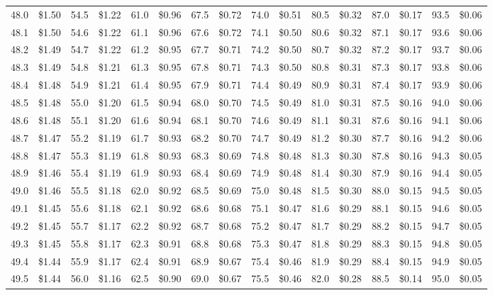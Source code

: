 \documentclass{article}
\begin{document}
\begin{tabular}{|*{8}{rr|}}
48.0 & \$1.50 & 54.5 & \$1.22 & 61.0 & \$0.96 & 67.5 & \$0.72 & 74.0 & \$0.51 & 80.5 & \$0.32 & 87.0 & \$0.17 & 93.5 & \$0.06\\
48.1 & \$1.50 & 54.6 & \$1.22 & 61.1 & \$0.96 & 67.6 & \$0.72 & 74.1 & \$0.50 & 80.6 & \$0.32 & 87.1 & \$0.17 & 93.6 & \$0.06\\
48.2 & \$1.49 & 54.7 & \$1.22 & 61.2 & \$0.95 & 67.7 & \$0.71 & 74.2 & \$0.50 & 80.7 & \$0.32 & 87.2 & \$0.17 & 93.7 & \$0.06\\
48.3 & \$1.49 & 54.8 & \$1.21 & 61.3 & \$0.95 & 67.8 & \$0.71 & 74.3 & \$0.50 & 80.8 & \$0.31 & 87.3 & \$0.17 & 93.8 & \$0.06\\
48.4 & \$1.48 & 54.9 & \$1.21 & 61.4 & \$0.95 & 67.9 & \$0.71 & 74.4 & \$0.49 & 80.9 & \$0.31 & 87.4 & \$0.17 & 93.9 & \$0.06\\
48.5 & \$1.48 & 55.0 & \$1.20 & 61.5 & \$0.94 & 68.0 & \$0.70 & 74.5 & \$0.49 & 81.0 & \$0.31 & 87.5 & \$0.16 & 94.0 & \$0.06\\
48.6 & \$1.48 & 55.1 & \$1.20 & 61.6 & \$0.94 & 68.1 & \$0.70 & 74.6 & \$0.49 & 81.1 & \$0.31 & 87.6 & \$0.16 & 94.1 & \$0.06\\
48.7 & \$1.47 & 55.2 & \$1.19 & 61.7 & \$0.93 & 68.2 & \$0.70 & 74.7 & \$0.49 & 81.2 & \$0.30 & 87.7 & \$0.16 & 94.2 & \$0.06\\
48.8 & \$1.47 & 55.3 & \$1.19 & 61.8 & \$0.93 & 68.3 & \$0.69 & 74.8 & \$0.48 & 81.3 & \$0.30 & 87.8 & \$0.16 & 94.3 & \$0.05\\
48.9 & \$1.46 & 55.4 & \$1.19 & 61.9 & \$0.93 & 68.4 & \$0.69 & 74.9 & \$0.48 & 81.4 & \$0.30 & 87.9 & \$0.16 & 94.4 & \$0.05\\
49.0 & \$1.46 & 55.5 & \$1.18 & 62.0 & \$0.92 & 68.5 & \$0.69 & 75.0 & \$0.48 & 81.5 & \$0.30 & 88.0 & \$0.15 & 94.5 & \$0.05\\
49.1 & \$1.45 & 55.6 & \$1.18 & 62.1 & \$0.92 & 68.6 & \$0.68 & 75.1 & \$0.47 & 81.6 & \$0.29 & 88.1 & \$0.15 & 94.6 & \$0.05\\
49.2 & \$1.45 & 55.7 & \$1.17 & 62.2 & \$0.92 & 68.7 & \$0.68 & 75.2 & \$0.47 & 81.7 & \$0.29 & 88.2 & \$0.15 & 94.7 & \$0.05\\
49.3 & \$1.45 & 55.8 & \$1.17 & 62.3 & \$0.91 & 68.8 & \$0.68 & 75.3 & \$0.47 & 81.8 & \$0.29 & 88.3 & \$0.15 & 94.8 & \$0.05\\
49.4 & \$1.44 & 55.9 & \$1.17 & 62.4 & \$0.91 & 68.9 & \$0.67 & 75.4 & \$0.46 & 81.9 & \$0.29 & 88.4 & \$0.15 & 94.9 & \$0.05\\
49.5 & \$1.44 & 56.0 & \$1.16 & 62.5 & \$0.90 & 69.0 & \$0.67 & 75.5 & \$0.46 & 82.0 & \$0.28 & 88.5 & \$0.14 & 95.0 & \$0.05\\

\end{tabular}
\end{document}
